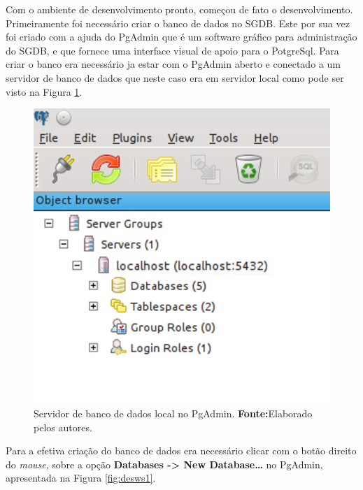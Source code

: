 
	\par Com o ambiente de desenvolvimento pronto, começou de fato o
desenvolvimento. Primeiramente foi necessário criar o banco de dados no SGDB.
Este por sua vez foi criado com a ajuda do PgAdmin que é um software gráfico
para administração do SGDB, e que fornece uma interface visual de apoio para o
PotgreSql. Para criar o banco era necessário ja estar com o PgAdmin aberto e
conectado a um servidor de banco de dados que neste caso era em servidor local como pode
ser visto na Figura \ref{fig:desws}.

	\begin{figure}[h!]
		\centerline{\includegraphics[scale=0.5]{./imagens/2_q_metodologico/4_procedimentos_resultados/43_webservice/432_desenvolvimento/desws.png}}
		\caption[Servidor de banco de dados local no PgAdmin]{Servidor de banco de
		dados local no PgAdmin.
			\textbf{Fonte:}Elaborado pelos autores.}
		\label{fig:desws}
	\end{figure}
	
	\par Para a efetiva criação do banco de dados era necessário clicar com o
botão direito do \textit{mouse}, sobre a opção \textbf{Databases -> New
Database\ldots} no PgAdmin, apresentada na Figura \ref{fig:desws1}.


